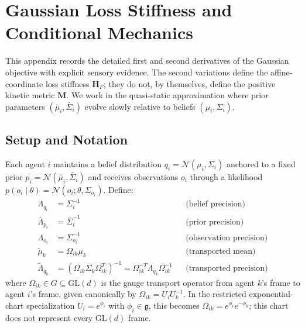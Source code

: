 \documentclass[12pt]{article}
\begin{document}

\section{Gaussian Loss Stiffness and Conditional Mechanics}
\label{app:hamiltonian}

This appendix records the detailed first and second derivatives of the Gaussian objective with explicit sensory evidence. The second variations define the affine-coordinate loss stiffness $\mathbf H_F$; they do not, by themselves, define the positive kinetic metric $\mathbf M$. We work in the quasi-static approximation where prior parameters $(\bar{\mu}_i, \bar{\Sigma}_i)$ evolve slowly relative to beliefs $(\mu_i, \Sigma_i)$.

\subsection{Setup and Notation}

Each agent $i$ maintains a belief distribution $q_i = \mathcal{N}(\mu_i, \Sigma_i)$ anchored to a fixed prior $p_i = \mathcal{N}(\bar{\mu}_i, \bar{\Sigma}_i)$ and receives observations $o_i$ through a likelihood $p(o_i \mid \theta) = \mathcal{N}(o_i; \theta, \Sigma_{o_i})$. Define:
%
\begin{align}
\Lambda_{q_i} &= \Sigma_i^{-1} & &\text{(belief precision)} \\
\bar{\Lambda}_{p_i} &= \bar{\Sigma}_i^{-1} & &\text{(prior precision)} \\
\Lambda_{o_i} &= \Sigma_{o_i}^{-1} & &\text{(observation precision)} \\
\tilde{\mu}_k &= \Omega_{ik}\mu_k & &\text{(transported mean)} \\
\tilde{\Lambda}_{q_k} &= \left(\Omega_{ik}\Sigma_k\Omega_{ik}^T\right)^{-1} = \Omega_{ik}^{-T}\Lambda_{q_k}\Omega_{ik}^{-1} & &\text{(transported precision)}
\end{align}
%
where $\Omega_{ik}\in G\subseteq\mathrm{GL}(d)$ is the gauge transport operator from agent $k$'s frame to agent $i$'s frame, given canonically by $\Omega_{ik}=U_iU_k^{-1}$. In the restricted exponential-chart specialization $U_i=e^{\phi_i}$ with $\phi_i\in\mathfrak g$, this becomes $\Omega_{ik}=e^{\phi_i}e^{-\phi_k}$; this chart does not represent every $\mathrm{GL}(d)$ frame.
\end{document}
